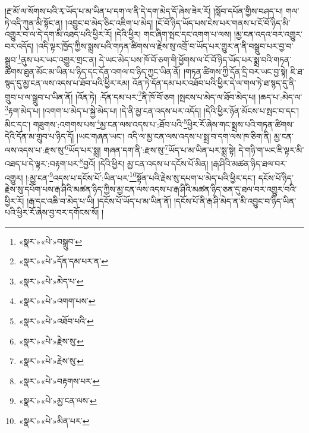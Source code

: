 །རྔ་མོ་ལ་སོགས་པའི་རྭ་ཡོད་པ་མ་ཡིན་པ་དག་ལ་ནི་དེ་དག་མེད་དོ་ཞེས་ཟེར་རོ། །སློབ་དཔོན་གྱིས་བཤད་པ། གལ་ཏེ་འདི་ཀུན་མི་སྟོང་ན། །འབྱུང་བ་མེད་ཅིང་འཇིག་པ་མེད། །ངོ་བོ་ཉིད་ཡོད་པས་ངེས་པར་གནས་པ་ངོ་བོ་ཉིད་མི་འགྱུར་བ་ལ་དེ་དག་མི་འཐད་པའི་ཕྱིར་རོ། །དེའི་ཕྱིར། གང་ཞིག་སྤང་དང་འགག་པ་ལས། །མྱ་ངན་འདའ་བར་འགྱུར་བར་འདོད། །འདི་ལྟར་ཁྱོད་ཀྱིས་སྨྲས་པའི་གཏན་ཚིགས་ལ་རྗེས་སུ་འགྲོ་བ་ཡོད་པར་གྱུར་ན་ནི་བསྒྲུབ་པར་བྱ་བ་སྒྲུབ་\footnote{«སྣར་»«པེ་»བསྒྲུབ་}ནུས་པར་ཡང་འགྱུར་གྲང་ན། དེ་ཡང་མེད་པས་ཁོ་བོ་ཅག་གི་ཕྱོགས་ལ་ངོ་བོ་ཉིད་ཡོད་པར་སྨྲ་བའི་གཏན་ཚིགས་ཐུན་མོང་མ་ཡིན་པ་ཉིད་དང་དོན་འགལ་བ་ཉིད་ཀྱང་ཡིན་ནོ། །གཏན་ཚིགས་ཀྱི་དོན་དྲི་བར་ཡང་བྱ་སྟེ། ཇི་ཐ་སྙད་དུ་མྱ་ངན་ལས་འདས་པ་ཐོབ་པའི་ཕྱིར་རམ། འོན་ཏེ་དོན་དམ་པར་འཐོབ་པའི་ཕྱིར་དེ་ལ་གལ་ཏེ་ཐ་སྙད་དུ་ནི་གྲུབ་པ་ལ་སྒྲུབ་པ་ཡིན་ནོ། །འོན་ཏེ། :དོན་དམ་པར་\footnote{«སྣར་»«པེ་»དོན་དམ་པར་ན་}ནི་ཁོ་བོ་ཅག །སྤངས་པ་མེད་ལ་ཐོབ་མེད་པ། །ཆད་པ་:མེད་ལ་\footnote{«སྣར་»«པེ་»མེད་པ་}རྟག་མེད་པ། །འགག་པ་མེད་པ་སྐྱེ་མེད་པ། །དེ་ནི་མྱ་ངན་འདས་པར་འདོད། །དེའི་ཕྱིར་ཉོན་མོངས་པ་སྤང་བ་དང་། མིང་དང་། གཟུགས་:འགགས་པས་\footnote{«སྣར་»«པེ་»འགག་པས་}མྱ་ངན་ལས་འདས་པ་:ཐོབ་པའི་\footnote{«སྣར་»«པེ་»འཐོབ་པའི་}ཕྱིར་རོ་ཞེས་གང་སྨྲས་པའི་གཏན་ཚིགས་དེའི་དོན་མ་གྲུབ་པ་ཉིད་དོ། །ཡང་གཞན་ཡང་། འདི་ལ་མྱ་ངན་ལས་འདས་པ་སྨྲ་བ་དག་ལས་ཁ་ཅིག་ནི། མྱ་ངན་ལས་འདས་པ་:རྫས་སུ་\footnote{«སྣར་»«པེ་»རྗེས་སུ་}ཡོད་པར་སྨྲ། གཞན་དག་ནི་:རྫས་སུ་\footnote{«སྣར་»«པེ་»རྗེས་སུ་}ཡོད་པ་མ་ཡིན་པར་སྨྲ་སྟེ། དེ་གཉི་ག་ཡང་ཇི་ལྟར་མི་འཐད་པ་དེ་ལྟར་:བརྟག་པར་\footnote{«སྣར་»«པེ་»བརྟགས་པར་}བྱའོ། །དེའི་ཕྱིར། མྱ་ངན་འདས་པ་དངོས་པོ་མིན། །རྒ་ཤིའི་མཚན་ཉིད་ཐལ་བར་འགྱུར། །:མྱ་ངན་\footnote{«སྣར་»«པེ་»མྱ་ངན་ལས་}འདས་པ་དངོས་པོ་:ཡིན་པར་\footnote{«སྣར་»«པེ་»མིན་པར་}སྟོན་པའི་རྗེས་སུ་དཔག་པ་མེད་པའི་ཕྱིར་དང་། དངོས་པོ་ཉིད་རྗེས་སུ་དཔོག་པས་རྒ་ཤིའི་མཚན་ཉིད་ཀྱིས་མྱ་ངན་ལས་འདས་པ་རྒ་ཤིའི་མཚན་ཉིད་ཅན་དུ་ཐལ་བར་འགྱུར་བའི་ཕྱིར་རོ། །རྒ་དང་འཆི་བ་མེད་པ་ཡི། །དངོས་པོ་ཡོད་པ་མ་ཡིན་ནོ། །དངོས་པོ་ནི་རྒ་ཤི་མེད་ན་མི་འབྱུང་བ་ཉིད་ཡིན་པའི་ཕྱིར་རོ་ཞེས་བྱ་བར་དགོངས་སོ། །
